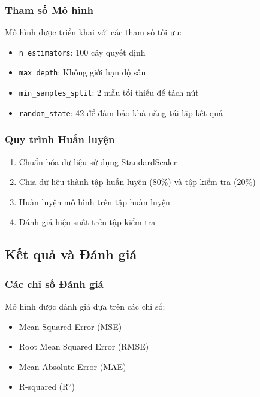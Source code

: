 \subsubsection{Tham số Mô hình}
Mô hình được triển khai với các tham số tối ưu:
\begin{itemize}
    \item \texttt{n\_estimators}: 100 cây quyết định
    \item \texttt{max\_depth}: Không giới hạn độ sâu
    \item \texttt{min\_samples\_split}: 2 mẫu tối thiểu để tách nút
    \item \texttt{random\_state}: 42 để đảm bảo khả năng tái lập kết quả
\end{itemize}

\subsubsection{Quy trình Huấn luyện}
\begin{enumerate}
    \item Chuẩn hóa dữ liệu sử dụng StandardScaler
    \item Chia dữ liệu thành tập huấn luyện (80\%) và tập kiểm tra (20\%)
    \item Huấn luyện mô hình trên tập huấn luyện
    \item Đánh giá hiệu suất trên tập kiểm tra
\end{enumerate}

\subsection{Kết quả và Đánh giá}

\subsubsection{Các chỉ số Đánh giá}
Mô hình được đánh giá dựa trên các chỉ số:
\begin{itemize}
    \item Mean Squared Error (MSE)
    \item Root Mean Squared Error (RMSE)
    \item Mean Absolute Error (MAE)
    \item R-squared (R²)
\end{itemize}

